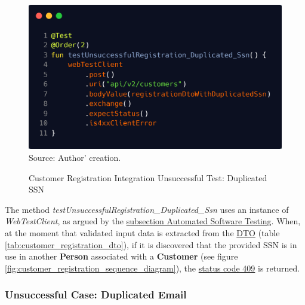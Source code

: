 \begin{figure}[H]
	\centering
	\caption{Customer Registration Integration Unsuccessful Test: Duplicated SSN}
	\includegraphics[width=1\linewidth]{figures/customer_registration_integration_test_unsuccess_duplicated_ssn.png}
	\label{fig:customer_registration_integration_test_unsuccess_duplicated_ssn}
	\footnotesize Source: Author' creation.
\end{figure}

The method \textit{testUnsuccessfulRegistration\_Duplicated\_Ssn} uses an instance of \textit{WebTestClient}, as argued by the \hyperref[subsection:automated_software_testing]{subsection Automated Software Testing}. When, at the moment that validated input data is extracted from the \hyperref[appendix:glossary]{DTO} (table \ref{tab:customer_registration_dto}), if it is discovered that the provided SSN is in use in another \textbf{Person} associated with a \textbf{Customer} (see figure \ref{fig:customer_registration_sequence_diagram}), the \hyperref[tab:summary_http_status_codes]{status code 409} is returned.

\subsubsection{Unsuccessful Case: Duplicated Email}
\label{customer_registration_unsuccessful_test_duplicated_email}

